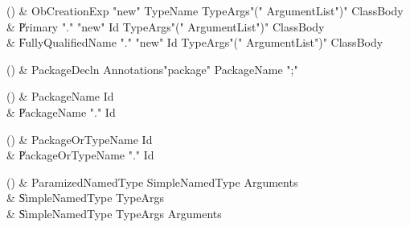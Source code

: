 \begin{bbgrammarappendix}{3.7in}

() & ObCreationExp \label{prod:ObCreationExp}  \: \xcd"new" TypeName TypeArgs\opt \xcd"(" ArgumentList\opt \xcd")" ClassBody\opt  \\

 &    \| Primary \xcd"." \xcd"new" Id TypeArgs\opt \xcd"(" ArgumentList\opt \xcd")" ClassBody\opt \\
 &    \| FullyQualifiedName \xcd"." \xcd"new" Id TypeArgs\opt \xcd"(" ArgumentList\opt \xcd")" ClassBody\opt \\

\end{bbgrammarappendix}

\begin{bbgrammarappendix}{3.8in}

() & PackageDecln \label{prod:PackageDecln}  \: Annotations\opt \xcd"package" PackageName \xcd";"  \\


\end{bbgrammarappendix}

\begin{bbgrammarappendix}{3.9in}

() & PackageName \label{prod:PackageName}  \: Id  \\

 &    \| PackageName \xcd"." Id \\

\end{bbgrammarappendix}

\begin{bbgrammarappendix}{3.3in}

() & PackageOrTypeName \label{prod:PackageOrTypeName}  \: Id  \\

 &    \| PackageOrTypeName \xcd"." Id \\

\end{bbgrammarappendix}

\begin{bbgrammarappendix}{3.2in}

() & ParamizedNamedType \label{prod:ParamizedNamedType}  \: SimpleNamedType Arguments  \\

 &    \| SimpleNamedType TypeArgs \\
 &    \| SimpleNamedType TypeArgs Arguments \\

\end{bbgrammarappendix}


